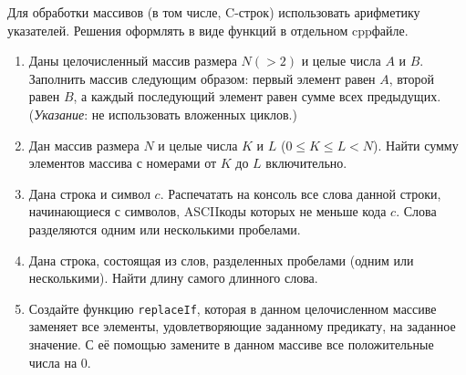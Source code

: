 Для обработки массивов (в том числе, C-строк) использовать
арифметику указателей. Решения оформлять в виде функций в отдельном cpp\nbdash{}файле.
\begin{enumerate}
    \itemsep=\myitemsep
    \item Даны целочисленный массив размера $N (> 2)$ и целые числа $A$ и $B$.
    Заполнить массив следующим образом: первый элемент равен $A$, второй равен
    $B$, а каждый последующий элемент равен сумме всех предыдущих.
    (\emph{Указание}: не использовать вложенных циклов.)
    
    \item Дан массив размера $N$ и целые числа $K$ и $L$
    ($0 \leqslant K \leqslant L < N$). Найти сумму элементов массива с
    номерами от $K$ до $L$ включительно.
    
    \item Дана строка и символ $c$. Распечатать на консоль все слова данной
    строки, начинающиеся с символов, ASCII\nbdash{}коды которых не меньше кода
    $c$. Слова разделяются одним или несколькими пробелами.
    
    \item Дана строка, состоящая из слов, разделенных пробелами (одним
    или несколькими). Найти длину самого длинного слова.
    
    \item Создайте функцию \texttt{replaceIf}, которая в данном целочисленном
    массиве заменяет все элементы, удовлетворяющие заданному предикату, на
    заданное значение. С её помощью замените в данном массиве все положительные
    числа на 0.
\end{enumerate}